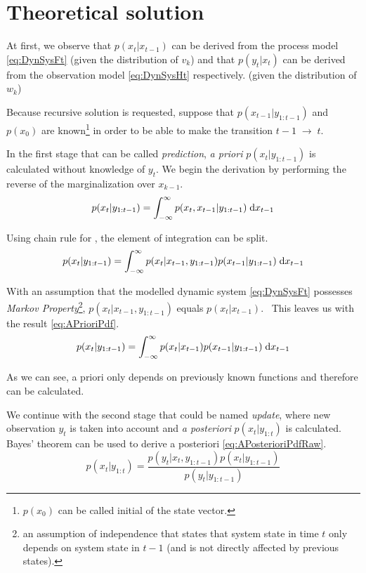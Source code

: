 \section{Theoretical solution}

At first, we observe that {\pdf} \(p(x_t|x_{t-1})\) can be derived from the process model
\eqref{eq:DynSysFt} (given the distribution of \(v_k\)) and that \(p(y_t|x_t)\) can be derived from
the observation model \eqref{eq:DynSysHt} respectively. (given the distribution of \(w_k\))

Because recursive solution is requested, suppose that \(p(x_{t-1}|y_{1:t-1})\) and
\(p(x_0)\) are known\footnote{\(p(x_0)\) can be called initial {\pdf} of the state vector.} in
order to be able to make the transition \(t-1 \; \rightarrow \; t\).

In the first stage that can be called \emph{prediction}, \emph{a priori} {\pdf}
\(p(x_t | y_{1:t-1})\) is calculated without knowledge of \(y_t\). We begin the derivation by
performing the reverse of the marginalization over \(x_{k-1}\).
\begin{equation*}
	p(x_t | y_{1:t-1}) = \int_{-\infty}^{\infty} p(x_t, x_{t-1} | y_{1:t-1}) \; \mathrm{d}x_{t-1}
\end{equation*}

Using chain rule for {\pdfs}, the element of integration can be split.
\begin{equation*}
	p(x_t | y_{1:t-1}) = \int_{-\infty}^{\infty} p(x_t | x_{t-1}, y_{1:t-1}) p(x_{t-1} | y_{1:t-1}) \; \mathrm{d}x_{t-1}
\end{equation*}

With an assumption that the modelled dynamic system \eqref{eq:DynSysFt} possesses \emph{Markov
Property}\footnote{an assumption of independence that states that system state in time \(t\) only
depends on system state in \(t-1\) (and is not directly affected by previous states).},
\(p(x_t | x_{t-1}, y_{1:t-1})\) equals \(p(x_t | x_{t-1})\).~\cite{AruMasGor:02}
This leaves us with the result \eqref{eq:APrioriPdf}.
\begin{equation} \label{eq:APrioriPdf}
	p(x_t | y_{1:t-1}) = \int_{-\infty}^{\infty} p(x_t | x_{t-1}) p(x_{t-1} | y_{1:t-1}) \; \mathrm{d}x_{t-1}
\end{equation}

As we can see, a priori {\pdf} only depends on previously known functions and therefore can be
calculated.

We continue with the second stage that could be named \emph{update}, where new observation \(y_t\) is taken into
account and \emph{a posteriori} {\pdf} \(p(x_t | y_{1:t})\) is calculated. Bayes' theorem can be used
to derive a posteriori {\pdf} \eqref{eq:APosterioriPdfRaw}.
\begin{equation} \label{eq:APosterioriPdfRaw}
	p(x_t | y_{1:t}) = \frac{p(y_t | x_t, y_{1:t-1}) p(x_t | y_{1:t-1})}{p(y_t | y_{1:t-1})}
\end{equation}

